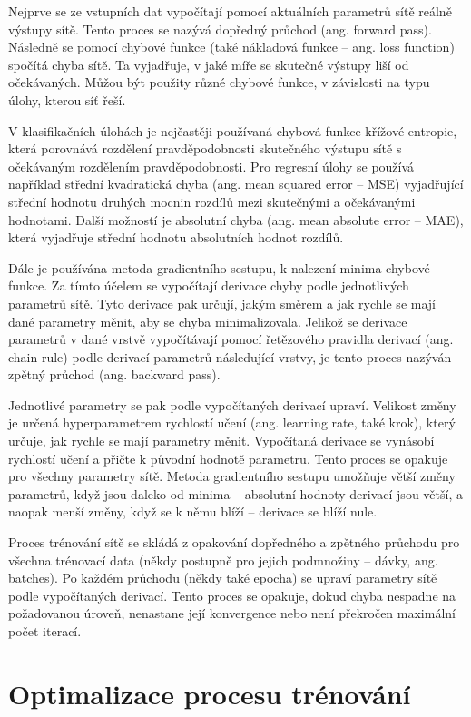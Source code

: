 Nejprve se ze vstupních dat vypočítají pomocí aktuálních parametrů sítě reálně
výstupy sítě. Tento proces se nazývá dopředný průchod (ang. forward pass).
Následně se pomocí chybové funkce (také nákladová funkce – ang. loss function)
spočítá chyba sítě. Ta vyjadřuje, v jaké míře se skutečné výstupy liší od
očekávaných. Můžou být použity různé chybové funkce, v závislosti na typu
úlohy, kterou síť řeší.

V klasifikačních úlohách je nejčastěji používaná chybová funkce křížové
entropie, která porovnává rozdělení pravděpodobnosti skutečného výstupu sítě s
očekávaným rozdělením pravděpodobnosti. Pro regresní úlohy se používá například
střední kvadratická chyba (ang. mean squared error – MSE) vyjadřující střední
hodnotu druhých mocnin rozdílů mezi skutečnými a očekávanými hodnotami. Další
možností je absolutní chyba (ang. mean absolute error – MAE), která vyjadřuje
střední hodnotu absolutních hodnot rozdílů.

Dále je používána metoda gradientního sestupu, k nalezení minima chybové
funkce. Za tímto účelem se vypočítají derivace chyby podle jednotlivých
parametrů sítě. Tyto derivace pak určují, jakým směrem a jak rychle se mají
dané parametry měnit, aby se chyba minimalizovala. Jelikož se derivace
parametrů v dané vrstvě vypočítávají pomocí řetězového pravidla derivací (ang.
chain rule) podle derivací parametrů následující vrstvy, je tento proces
nazýván zpětný průchod (ang. backward pass).

Jednotlivé parametry se pak podle vypočítaných derivací upraví. Velikost změny
je určená hyperparametrem rychlostí učení (ang. learning rate, také krok),
který určuje, jak rychle se mají parametry měnit. Vypočítaná derivace se
vynásobí rychlostí učení a přičte k původní hodnotě parametru. Tento proces se
opakuje pro všechny parametry sítě. Metoda gradientního sestupu umožňuje větší
změny parametrů, když jsou daleko od minima – absolutní hodnoty derivací jsou
větší, a naopak menší změny, když se k němu blíží – derivace se blíží nule.

Proces trénování sítě se skládá z opakování dopředného a zpětného průchodu pro
všechna trénovací data (někdy postupně pro jejich podmnožiny – dávky, ang.
batches). Po každém průchodu (někdy také epocha) se upraví parametry sítě podle
vypočítaných derivací. Tento proces se opakuje, dokud chyba nespadne na
požadovanou úroveň, nenastane její konvergence nebo není překročen maximální
počet iterací.

\section{Optimalizace procesu trénování}

